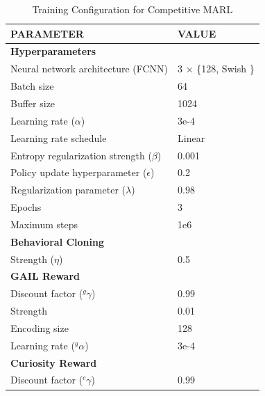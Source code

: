 \documentclass[letterpaper, 10 pt, conference]{ieeeconf}  %
\begin{document}
	\begin{table}[t]
		\caption{Training Configuration for Competitive MARL}
		\begin{center}
			\begin{tabular}{l|l}
				\hline
				\textbf{PARAMETER}                        & \textbf{VALUE}        \\ \hline
				\multicolumn{2}{l}{\textbf{Hyperparameters}}                      \\ \hline
				Neural network architecture (FCNN)        & 3 $\times$ \{128, Swish \cite{ramachandran2017}\} \\
				Batch size                                & 64                    \\
				Buffer size                               & 1024                  \\
				Learning rate ($\alpha$)                  & 3e-4                  \\
				Learning rate schedule                    & Linear                \\
				Entropy regularization strength ($\beta$) & 0.001                 \\
				Policy update hyperparameter ($\epsilon$) & 0.2                   \\
				Regularization parameter ($\lambda$)      & 0.98                  \\
				Epochs                                    & 3                     \\
				Maximum steps                             & 1e6                   \\ \hline
				\multicolumn{2}{l}{\textbf{Behavioral Cloning}}                   \\ \hline
				Strength ($\eta$)                         & 0.5                   \\ \hline
				\multicolumn{2}{l}{\textbf{GAIL Reward}}                          \\ \hline
				Discount factor ($^{g}\gamma$)            & 0.99                  \\
				Strength                                  & 0.01                  \\
				Encoding size                             & 128                   \\
				Learning rate ($^{g}\alpha$)              & 3e-4                  \\ \hline
				\multicolumn{2}{l}{\textbf{Curiosity Reward}}                     \\ \hline
				Discount factor ($^{c}\gamma$)            & 0.99                  \\

\end{tabular}
\end{center}
\end{table}
\end{document}
